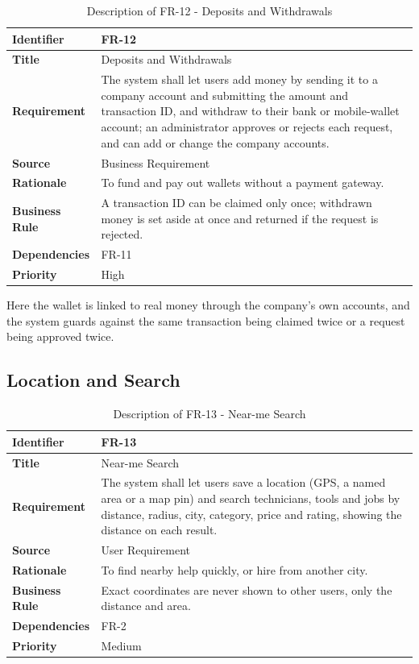 \documentclass[A4paper,12pt]{report}
\theoremstyle{plain}
\theoremstyle{definition}
\theoremstyle{remark}
\numberwithin{equation}{section}
\begin{document}
\begin{table}[h!]
\centering
\caption{Description of FR-12 - Deposits and Withdrawals}
\begin{tabular}{|p{}|p{}|}
\hline
\textbf{Identifier} & FR-12 \\ \hline
\textbf{Title} & Deposits and Withdrawals \\ \hline
\textbf{Requirement} & The system shall let users add money by sending it to a company account and submitting the amount and transaction ID, and withdraw to their bank or mobile-wallet account; an administrator approves or rejects each request, and can add or change the company accounts. \\ \hline
\textbf{Source} & Business Requirement \\ \hline
\textbf{Rationale} & To fund and pay out wallets without a payment gateway. \\ \hline
\textbf{Business Rule} & A transaction ID can be claimed only once; withdrawn money is set aside at once and returned if the request is rejected. \\ \hline
\textbf{Dependencies} & FR-11 \\ \hline
\textbf{Priority} & High \\ \hline
\end{tabular}
\end{table}

Here the wallet is linked to real money through the company's own accounts, and the system guards against the same transaction being claimed twice or a request being approved twice.

\subsection{Location and Search}

\begin{table}[h!]
\centering
\caption{Description of FR-13 - Near-me Search}
\begin{tabular}{|p{}|p{}|}
\hline
\textbf{Identifier} & FR-13 \\ \hline
\textbf{Title} & Near-me Search \\ \hline
\textbf{Requirement} & The system shall let users save a location (GPS, a named area or a map pin) and search technicians, tools and jobs by distance, radius, city, category, price and rating, showing the distance on each result. \\ \hline
\textbf{Source} & User Requirement \\ \hline
\textbf{Rationale} & To find nearby help quickly, or hire from another city. \\ \hline
\textbf{Business Rule} & Exact coordinates are never shown to other users, only the distance and area. \\ \hline
\textbf{Dependencies} & FR-2 \\ \hline
\textbf{Priority} & Medium \\ \hline
\end{tabular}
\end{table}
\end{document}
